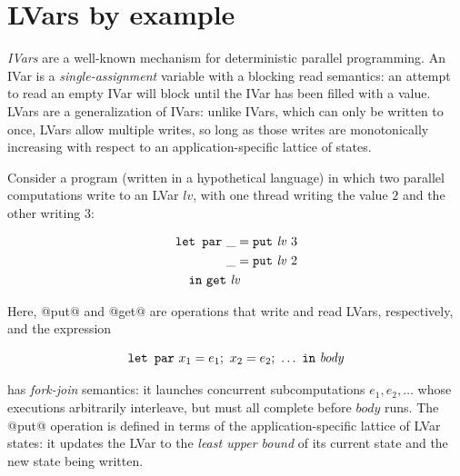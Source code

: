 \section{LVars by example}\label{s:lvars-examples}

\emph{IVars} \cite{IStructures, id, CnC, monad-par} are a well-known
mechanism for deterministic parallel programming.  An IVar is a
\emph{single-assignment} variable \cite{Tesler-1968} with a blocking
read semantics: an attempt to read an empty IVar will block until the
IVar has been filled with a value.  LVars are a generalization of
IVars: unlike IVars, which can only be written to once, LVars allow
multiple writes, so long as those writes are monotonically increasing
with respect to an application-specific lattice of states.

Consider a program (written in a hypothetical language) in which two
parallel computations write to an LVar $\mathit{lv}$, with one thread
writing the value $2$ and the other writing $3$:

\singlespacing
\begin{equation}
\begin{split}
& \LETPAR ~\_ = \putexp{\mathit{lv}}{3} \\
&  \letparspace ~\_ = \putexp{\mathit{lv}}{2} \\
&  \letspace \IN~ \GET~\mathit{lv}
\end{split}
\label{e:lvar-example-1}
\end{equation}
\doublespacing

Here, @put@ and @get@ are operations that write and read LVars,
respectively, and the expression

\singlespacing
\begin{displaymath}
\mbox{\texttt{\mbox{\texttt{let}}~\mbox{\texttt{par}}}}~x_1=e_1;~x_2=e_2;~\dots~\mbox{\texttt{in}}~\mathit{body}
\end{displaymath}
\doublespacing

has \emph{fork-join} semantics: it launches concurrent subcomputations
$e_1, e_2, \dots$ whose executions arbitrarily interleave, but must
all complete before $\mathit{body}$ runs.  The @put@ operation is
defined in terms of the application-specific lattice of LVar states:
it updates the LVar to the \emph{least upper bound} of its current
state and the new state being written.

